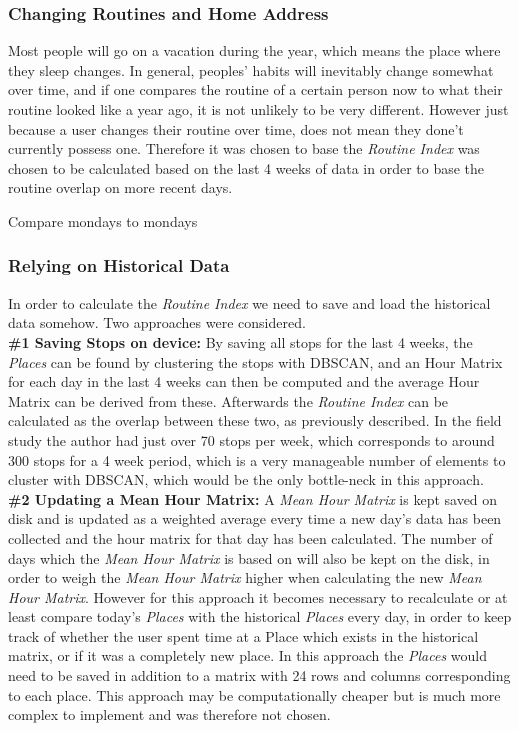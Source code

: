 \subsubsection*{Changing Routines and Home Address}
Most people will go on a vacation during the year, which means the place where they sleep changes. In general, peoples' habits will inevitably change somewhat over time, and if one compares the routine of a certain person now to what their routine looked like a year ago, it is not unlikely to be very different. However just because a user changes their routine over time, does not mean they done't currently possess one. Therefore it was chosen to base the \textit{Routine Index} was chosen to be calculated based on the last 4 weeks of data in order to base the routine overlap on more recent days.

Compare mondays to mondays

\subsubsection*{Relying on Historical Data}
In order to calculate the \textit{Routine Index} we need to save and load the historical data somehow. Two approaches were considered.\\

\textbf{\#1 Saving Stops on device:} By saving all stops for the last 4 weeks, the \textit{Places} can be found by clustering the stops with DBSCAN, and an Hour Matrix for each day in the last 4 weeks can then be computed and the average Hour Matrix can be derived from these. Afterwards the \textit{Routine Index} can be calculated as the overlap between these two, as previously described. In the field study the author had just over 70 stops per week, which corresponds to around 300 stops for a 4 week period, which is a very manageable number of elements to cluster with DBSCAN, which would be the only bottle-neck in this approach.\\

\textbf{\#2 Updating a Mean Hour Matrix:} A \textit{Mean Hour Matrix} is kept saved on disk and is updated as a weighted average every time a new day's data has been collected and the hour matrix for that day has been calculated. The number of days which the  \textit{Mean Hour Matrix} is based on will also be kept on the disk, in order to weigh the  \textit{Mean Hour Matrix} higher when calculating the new  \textit{Mean Hour Matrix}. However for this approach it becomes necessary to recalculate or at least compare today's \textit{Places} with the historical \textit{Places} every day, in order to keep track of whether the user spent time at a Place which exists in the historical matrix, or if it was a completely new place. In this approach the \textit{Places} would need to be saved in addition to a matrix with 24 rows and columns corresponding to each place. This approach may be computationally cheaper but is much more complex to implement and was therefore not chosen.

